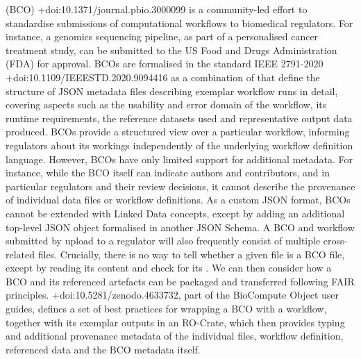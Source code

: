 \markdownRendererInterblockSeparator
{} (BCO) +{}{}{doi:10.1371/journal.pbio.3000099} is a community-led effort to standardise submissions of computational workflows to biomedical regulators. For instance, a genomics sequencing pipeline, as part of a personalised cancer treatment study, can be submitted to the US Food and Drugs Administration (FDA) for approval. BCOs are formalised in the standard IEEE 2791-2020 +{}{}{doi:10.1109/IEEESTD.2020.9094416} as a combination of  that define the structure of JSON metadata files describing exemplar workflow runs in detail, covering aspects such as the usability and error domain of the workflow, its runtime requirements, the reference datasets used and representative output data produced.\markdownRendererInterblockSeparator
{}BCOs provide a structured view over a particular workflow, informing regulators about its workings independently of the underlying workflow definition language. However, BCOs have only limited support for additional metadata. For instance, while the BCO itself can indicate authors and contributors, and in particular regulators and their review decisions, it cannot describe the provenance of individual data files or workflow definitions. \markdownRendererInterblockSeparator
{}As a custom JSON format, BCOs cannot be extended with Linked Data concepts, except by adding an additional top-level JSON object formalised in another JSON Schema. A BCO and workflow submitted by upload to a regulator will also frequently consist of multiple cross-related files. Crucially, there is no way to tell whether a given  file is a BCO file, except by reading its content and check for its . \markdownRendererInterblockSeparator
{}We can then consider how a BCO and its referenced artefacts can be packaged and transferred following FAIR principles. +{}{}{doi:10.5281/zenodo.4633732}, part of the BioCompute Object user guides, defines a set of best practices for wrapping a BCO with a workflow, together with its exemplar outputs in an RO-Crate, which then provides typing and additional provenance metadata of the individual files, workflow definition, referenced data and the BCO metadata itself. \markdownRendererInterblockSeparator

